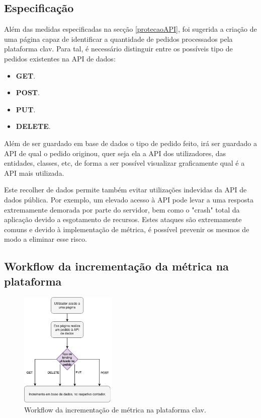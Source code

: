 \subsection{Especificação}
\vspace{-4mm}
Além das medidas especificadas na secção \ref{protecaoAPI}, foi sugerida a criação de uma página capaz de identificar a quantidade de pedidos processados pela plataforma \gls{clav}. Para tal, é necessário distinguir entre os possíveis tipo de pedidos existentes na API de dados: 
\vspace{-3mm}
\begin{itemize}
    \item \textbf{GET}.
    \vspace{-1.5mm}
    \item \textbf{POST}.
    \vspace{-1.5mm}
    \item \textbf{PUT}.
    \vspace{-1.5mm}
    \item \textbf{DELETE}.
\end{itemize}

\vspace{-1mm}
Além de ser guardado em base de dados o tipo de pedido feito, irá ser guardado a API de qual o pedido originou, quer seja ela a API dos utilizadores, das entidades, classes, etc, de forma a ser possível visualizar graficamente qual é a API mais utilizada.

Este recolher de dados permite também evitar utilizações indevidas da API de dados pública. Por exemplo, um elevado acesso à API pode levar a uma resposta extremamente demorada por parte do servidor, bem como o "crash" total da aplicação devido a esgotamento de recursos. Estes ataques são extremamente comuns e devido à implementação de métrica, é possível prevenir os mesmos de modo a eliminar esse risco.

\vspace{-6mm}
\subsection{Workflow da incrementação da métrica na plataforma}
\vspace{-10mm}
\begin{figure}[ht!]
    \centering
    \includegraphics[width=0.41\textwidth]{img/diagramas/gestaometrica/Metrica.png}
    \caption{Workflow da incrementação de métrica na plataforma \gls{clav}.}
    \label{fig:flow_Metrica}
\end{figure}

